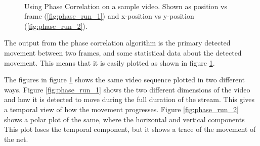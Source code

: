 \begin{figure}[htbp]
    \centering
    \\
	\caption{Using Phase Correlation on a sample video. 
		Shown as position vs frame (\ref{fig:phase_run_1}) and x-position vs y-position (\ref{fig:phase_run_2}).}
	\label{fig:phase_run}
\end{figure}

The output from the phase correlation algorithm is the primary detected movement between two frames, and some 
statistical data about the detected movement. This means that it is easily 
plotted as shown in figure \ref{fig:phase_run}. 

The figures in figure \ref{fig:phase_run} shows the 
same video sequence plotted in two different ways. Figure \ref{fig:phase_run_1} shows the two 
different dimensions of the video and how it is detected to move during the full duration of the stream. This gives a temporal 
view of how the movement progresses. Figure \ref{fig:phase_run_2} shows a polar plot of the same, where the horizontal and vertical 
components  This plot loses the temporal component, but it shows a trace of the 
movement of the net. 
